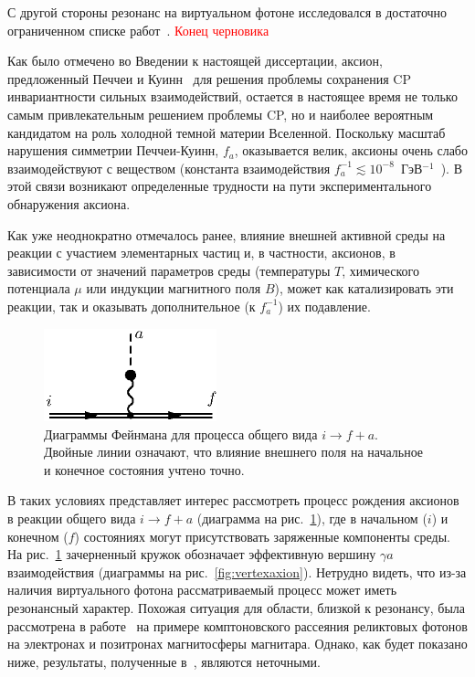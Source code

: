 С другой стороны резонанс на виртуальном фотоне исследовался в достаточно ограниченном списке работ~\cite{Skobelev:2007,MikhRumShk:09}.
\textcolor{red}{Конец черновика}

Как было отмечено во Введении к настоящей диссертации, аксион, предложенный Печчеи  и Куинн~\cite{Quinn:1977} для 
решения проблемы сохранения CP инвариантности 
сильных взаимодействий, остается в настоящее время не только самым привлекательным 
решением проблемы CP, но и наиболее вероятным кандидатом на роль холодной темной
материи Вселенной. Поскольку масштаб нарушения симметрии Печчеи-Куинн, $f_a$,
оказывается велик, аксионы очень слабо взаимодействуют с веществом
(константа взаимодействия $f_a^{-1} \lesssim 10^{-8}$\, ГэВ$^{-1}$~\cite{Raffelt:1996}). 
В этой связи возникают определенные трудности
на пути экспериментального обнаружения аксиона.

Как уже неоднократно отмечалось ранее, влияние внешней активной среды на реакции с 
участием элементарных частиц и, в частности,  аксионов,
в зависимости от значений параметров среды (температуры  $T$, 
химического потенциала  $\mu$ или индукции магнитного поля  $B$), может
 как катализировать эти реакции, так и оказывать дополнительное (к $f_a^{-1}$) 
их подавление.  

%
\begin{figure}
\centerline{\includegraphics[width=5cm]{fig5_1.eps}}
\caption{Диаграммы Фейнмана для процесса общего вида $i \to 
f+a$. Двойные линии означают, что влияние внешнего поля на начальное и 
конечное состояния учтено точно.}
\label{fig:Diagaxion}
\end{figure}


В таких условиях представляет интерес рассмотреть процесс рождения аксионов   в 
реакции общего вида $i \to f + a$ (диаграмма на рис.~\ref{fig:Diagaxion}), 
где в начальном ($i$) и конечном ($f$) состояниях могут присутствовать 
заряженные компоненты среды. 
На рис.~\ref{fig:Diagaxion} зачерненный
кружок обозначает эффективную вершину $\gamma a$ взаимодействия
(диаграммы на рис.~\ref{fig:vertexaxion}). Нетрудно видеть, что из-за наличия виртуального 
фотона рассматриваемый процесс может иметь резонансный характер. Похожая ситуация
для области, близкой к резонансу, была рассмотрена в работе~\cite{Skobelev:2007} 
на примере
комптоновского рассеяния реликтовых фотонов на электронах и позитронах магнитосферы
магнитара. Однако, как будет показано ниже,  результаты, полученные 
в~\cite{Skobelev:2007}, являются неточными. 

